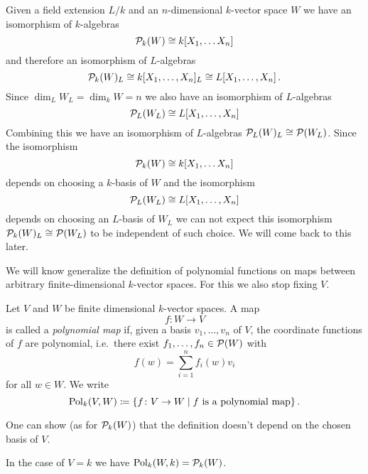 Given a field extension $L/k$ and an $n$-dimensional $k$-vector space $W$ we have an isomorphism of $k$-algebras
\[
        \mathcal{P}_k(W)
  \cong k[X_1, \dotsc X_n]
\]
and therefore an isomorphism of $L$-algebras
\[
        \mathcal{P}_k(W)_L
  \cong k[X_1, \dotsc, X_n]_L
  \cong L[X_1, \dotsc, X_n] \,.
\]
Since $\dim_L W_L = \dim_k W = n$ we also have an isomorphism of $L$-algebras
\[
        \mathcal{P}_L(W_L)
  \cong L[X_1, \dotsc, X_n]
\]
Combining this we have an isomorphism of $L$-algebras $\mathcal{P}_L(W)_L \cong \mathcal{P}(W_L)$. Since the isomorphism
\[
        \mathcal{P}_k(W)
  \cong k[X_1, \dotsc X_n]
\]
depends on choosing a $k$-basis of $W$ and the isomorphism
\[
        \mathcal{P}_L(W_L)
  \cong L[X_1, \dotsc, X_n]
\]
depends on choosing an $L$-basis of $W_L$ we can not expect this isomorphism $\mathcal{P}_k(W)_L \cong \mathcal{P}(W_L)$ to be independent of such choice.
We will come back to this later.


We will know generalize the definition of polynomial functions on maps between arbitrary finite-dimensional $k$-vector spaces.
For this we also stop fixing $V$.


\begin{definition}
  Let $V$ and $W$ be finite dimensional $k$-vector spaces. A map
  \[
            f
    \colon  W
    \to     V
  \]
  is called a \emph{polynomial map} if, given a basis $v_1, \dotsc, v_n$ of $V$, the coordinate functions of $f$ are polynomial, i.e.\ there exist $f_1, \dotsc, f_n \in \mathcal{P}(W)$ with
  \[
      f(w)
    = \sum_{i=1}^n f_i(w) v_i
  \]
  for all $w \in W$.
  We write
  \[
              \operatorname{Pol}_k(V,W)
    \coloneqq \{
                        f
                \colon  V
                \to     W
              \mid
                f \text{ is a polynomial map}
              \} \,.
  \]
\end{definition}


\begin{remark}
  One can show (as for $\mathcal{P}_k(W)$) that the definition doesn’t depend on the chosen basis of $V$.
\end{remark}


\begin{remark}
  In the case of $V = k$ we have $\operatorname{Pol}_k(W,k) = \mathcal{P}_k(W)$.
\end{remark}


